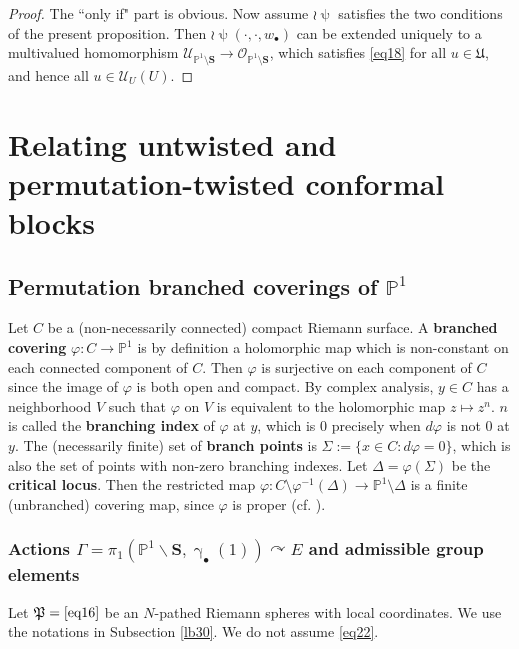 \documentclass[11pt,b5paper,notitlepage]{article}
\theoremstyle{definition}
\theoremstyle{plain}
\newcommand{\fk}{\mathfrak}
\newcommand{\scr}{\mathscr}
\newcommand{\blt}{\bullet}
\newcommand{\Pbb}{\mathbb P}
\newcommand{\Sbf}{\mathbf{S}}
\numberwithin{equation}{subsection}
\begin{document}
\begin{proof}
The ``only if" part is obvious. Now assume $\wr\uppsi$ satisfies the two conditions of the present proposition. Then  $\wr\uppsi(\cdot,\cdot,w_\blt)$ can be extended uniquely to a multivalued homomorphism $\scr U_{\Pbb^1\setminus\Sbf}\rightarrow\scr O_{\Pbb^1\setminus\Sbf}$, which satisfies \eqref{eq18} for all $u\in\fk U$, and hence all $u\in\scr U_U(U)$.
\end{proof}






\section{Relating untwisted and permutation-twisted conformal blocks}



\subsection{Permutation branched coverings of $\Pbb^1$}

Let $C$ be a (non-necessarily connected) compact Riemann surface. A \textbf{branched covering} $\varphi:C\rightarrow\Pbb^1$ is by definition a holomorphic map which is non-constant on each connected component of $C$. Then $\varphi$ is surjective on each component of $C$ since the image of $\varphi$ is both open and compact. By complex analysis, $y\in C$ has a neighborhood $V$ such that $\varphi$ on $V$ is equivalent to the holomorphic map $z\mapsto z^n$. $n$ is called the \textbf{branching index} of $\varphi$ at $y$, which is $0$ precisely when $d\varphi$ is not $0$ at $y$. The (necessarily finite) set of  \textbf{branch points} is $\Sigma:=\{x\in C:d\varphi=0\}$, which is also the set of points with non-zero branching indexes. Let $\Delta=\varphi(\Sigma)$ be the \textbf{critical locus}. Then the restricted map $\varphi:C\setminus\varphi^{-1}(\Delta)\rightarrow\Pbb^1\setminus\Delta$ is a finite (unbranched) covering map, since $\varphi$ is proper (cf. \cite[Sec. 4.2.1]{Don}). 



\subsubsection{Actions  $\Gamma=\pi_1(\Pbb^1\backslash\Sbf,\upgamma_\blt(1))\curvearrowright E$ and admissible group elements}\label{lb52}

Let $\fk P=\eqref{eq16}$ be an $N$-pathed Riemann spheres with local coordinates. We use the notations in Subsection \ref{lb30}. We do not assume \eqref{eq22}.
\end{document}
